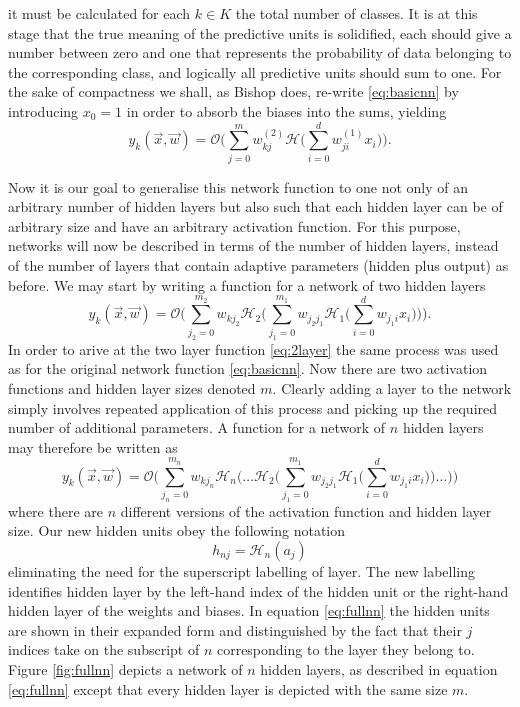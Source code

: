 it must be calculated for each $k \in K$ the total number of classes. It is at
this stage that the true meaning of the predictive units is solidified, each
should give a number between zero and one that represents the probability of
data belonging to the corresponding class, and logically all predictive units
should sum to one. For the sake of compactness we shall, as Bishop does,
re-write \eqref{eq:basicnn} by introducing $x_{0} = 1$ in order to absorb the
biases into the sums, yielding
\begin{equation}
y_k(\vec{x},\vec{w}) = \mathcal{O} \Bigg( \sum_{j=0}^{m} w_{kj}^{(2)}
\mathcal{H} \Bigg( \sum_{i=0}^{d} w_{ji}^{(1)} x_{i} \Bigg) \Bigg).
\label{eq:compactnn}
\end{equation}
\par Now it is our goal to generalise this network function to one not only of
an arbitrary number of hidden layers but also such that each hidden layer can be
of arbitrary size and have an arbitrary activation function. For this purpose,
networks will now be described in terms of the number of hidden layers, instead
of the number of layers that contain adaptive parameters (hidden plus output) as
before. We may start by writing a function for a network of two hidden layers
\begin{equation}
y_k(\vec{x},\vec{w}) = \mathcal{O} \Bigg( \sum_{j_{2}=0}^{m_{2}} w_{kj_{2}} \mathcal{H}_{2} 
\Bigg( \sum_{j_{1}=0}^{m_{1}} w_{j_{2}j_{1}} \mathcal{H}_{1} \Bigg( \sum_{i=0}^{d} w_{j_{1}i} x_{i} \Bigg) \Bigg) \Bigg).
\label{eq:2layer}
\end{equation}
In order to arive at the two layer function \eqref{eq:2layer} the same process
was used as for the original network function \eqref{eq:basicnn}. Now there are
two activation functions and hidden layer sizes denoted $m$. Clearly adding a
layer to the network simply involves repeated application of this process and
picking up the required number of additional parameters. A function for a
network of $n$ hidden layers may therefore be written as
\begin{equation}
y_k(\vec{x},\vec{w}) = \mathcal{O} \Bigg( \sum_{j_{n}=0}^{m_{n}} w_{kj_{n}}
\mathcal{H}_{n} \Bigg( \dots \mathcal{H}_2  \Bigg( \sum_{j_{1}=0}^{m_{1}} w_{j_{2}j_{1}} 
\mathcal{H}_{1} \Bigg( \sum_{i=0}^{d} w_{j_{1}i} x_{i} \Bigg) \Bigg) \dots \Bigg) \Bigg)
\label{eq:fullnn}
\end{equation}
where there are $n$ different versions of the activation function and hidden
layer size. Our new hidden units obey the following notation
\begin{equation}
h_{nj} = \mathcal{H}_n(a_j)
\label{eq:newhiddenunits}
\end{equation}
eliminating the need for the superscript labelling of layer. The new labelling
identifies hidden layer by the left-hand index of the hidden unit or the
right-hand hidden layer of the weights and biases. In equation \eqref{eq:fullnn}
the hidden units are shown in their expanded form and distinguished by the fact
that their $j$ indices take on the subscript of $n$ corresponding to the layer
they belong to. Figure \ref{fig:fullnn} depicts a network of $n$ hidden layers,
as described in equation \eqref{eq:fullnn} except that every hidden layer is
depicted with the same size $m$.

